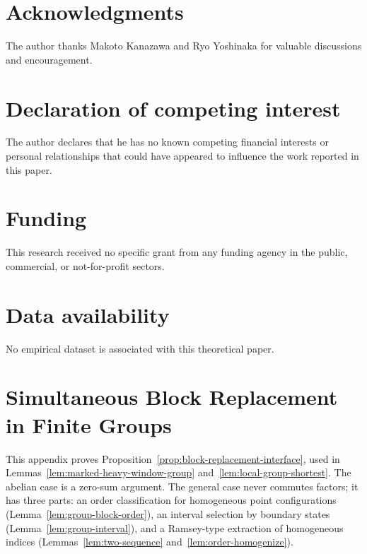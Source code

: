 \documentclass[11pt]{article}
\numberwithin{equation}{section}
\theoremstyle{plain}
\theoremstyle{definition}
\theoremstyle{remark}
\begin{document}
\section*{Acknowledgments}
The author thanks Makoto Kanazawa and Ryo Yoshinaka for valuable discussions
and encouragement.

\section*{Declaration of competing interest}
The author declares that he has no known competing financial interests or
personal relationships that could have appeared to influence the work reported
in this paper.

\section*{Funding}
This research received no specific grant from any funding agency in the public,
commercial, or not-for-profit sectors.

\section*{Data availability}
No empirical dataset is associated with this theoretical paper.

\appendix
\section{Simultaneous Block Replacement in Finite Groups}
\label{app:group-blocks}

This appendix proves Proposition~\ref{prop:block-replacement-interface}, used in
Lemmas~\ref{lem:marked-heavy-window-group} and~\ref{lem:local-group-shortest}.
The abelian case is a zero-sum argument.  The general case never commutes
factors; it has three parts: an order classification for homogeneous point
configurations (Lemma~\ref{lem:group-block-order}), an interval selection by
boundary states (Lemma~\ref{lem:group-interval}), and a Ramsey-type extraction of
homogeneous indices (Lemmas~\ref{lem:two-sequence} and~\ref{lem:order-homogenize}).
\end{document}
